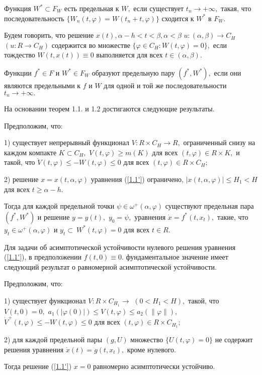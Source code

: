 \begin{definition}\label{d-3.1} Функция $W^*\subset F_W$ есть предельная к $W,$  если
	существует $t_n\to +\infty, $  такая,  что  последовательность $\{
	W_n(t,\varphi )=W(t_n+t,\varphi )\}$ сходится к $W^*$  в $F_{W}.$
\end{definition}

\begin{definition}\label{d-3.2} Будем говорить, что решение $x(t), \alpha - h < t < \beta, \alpha < \beta$
	$u : (\alpha ,\beta )\to C_{H}$ $(u : R\to C_{H})$ содержится во
	множестве $\{ \varphi\in C_{H} : W(t,\varphi )=0 \},$ если
	тождество $W(t, x(t))\equiv 0$ выполняется для всех $t\in (\alpha
	,\beta )$.
\end{definition}

\begin{definition}\label{d-4.1}  Функции $f^* \in F$ и $W^*\in F_W$ образуют
	предельную пару $(f^*,W^*),$ если они являются предельными  к $f$ и
	$W$ для  одной  и  той  же  последовательности $t_n\to +\infty .$
\end{definition}

На основании теорем 1.1. и 1.2 достигаются следующие результаты.

\begin{theorem}\label{t-1.3} Предположим, что:
	
	1) 
	существует непрерывный функционал $V : R \times C_H\to R,$  ограниченный
	снизу на каждом компакте $K\subset C_H,$ $V(t,\varphi )\ge m(K)$
	для всех $(t,\varphi )\in R \times K,$ и такой, что $\dot
	V(t,\varphi )\le -W(t,\varphi )\le 0$  для  всех $(t,\varphi )\in R
	\times C_H;$
	
	2) решение $x=x(t,\alpha ,\varphi )$ уравнения (\ref{1.1'})  ограничено,
	$|x(t,\alpha ,\varphi )|\le H_1<H$
	для всех $t\ge\alpha -h.$
	
	Тогда для каждой  предельной
	точки $\psi\in\omega ^+(\alpha ,\varphi )$  существуют  предельная
	пара  $(f^*, W^*)$ и решение $y=y(t),$ $y_0=\psi, $ уравнения $\dot x=f^*(t,x_t),$  такие,  что
	$ y_t\in \omega ^+(\alpha ,\varphi )$ и
	$y_t\subset\ { W^*(t,\varphi )=0}$
		для всех  $t\in R.$
\end{theorem}
	
Для задачи об асимптотической устойчивости нулевого решения уравнения (\ref{1.1'}), в предположении $f(t,0)\equiv 0.$ фундаментальное значение имеет следующий  результат о равномерной асимптотической устойчивости.
	
	\begin{theorem}\label{t-4.5} Предположим, что:
		
		1) существует функционал $V: R \times C_{H_1}\to $ $(0<H_1<H),$
		такой,  что $V(t,0)=0,$ $a_1(|\varphi (0)|)\le V(t,\varphi )\le a_2(\|\varphi \| ),$
		$\dot V^+(t,\varphi )\le -W(t,\varphi )\le 0$ для всех
		$(t,\varphi )\in R \times C_{H_1};$
		
		2) для  каждой  предельной пары $(g,U)$  множество $\{ U(t,\varphi )=0\}$  не
		содержит решения уравнения $\dot x(t)=g(t,x_t),$  кроме нулевого.
		
		
		Тогда решение (\ref{1.1'})  $x=0$ равномерно асимптотически устойчиво.
	\end{theorem}
	
